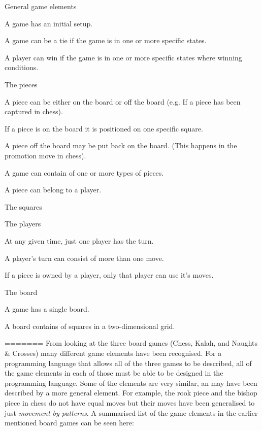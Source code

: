 \begin{dlist}
  \item[General game elements]
  	\begin{dlist}
  		\item A game has an initial setup.
  		\item A game can be a tie if the game is in one or more specific states.
  		\item A player can win if the game is in one or more specific states where winning conditions. 
  	\end{dlist}
  \item[The pieces]
  	\begin{dlist}
  		\item A piece can be either on the board or off the board (e.g. If a piece has been captured in chess).
  			\begin{dlist}
  				\item If a piece is on the board it is positioned on one specific square.
  				\item A piece off the board may be put back on the board. (This happens in the promotion move in chess).
  			\end{dlist}
  		\item A game can contain of one or more types of pieces.
  		\item A piece can belong to a player.
  	\end{dlist}
  \item[The squares]
  \item[The players]
  	\begin{dlist}
  		\item At any given time, just one player has the turn.
  		\item A player's turn can consist of more than one move.
  		\item If a piece is owned by a player, only that player can use it's moves.
  	\end{dlist}
  \item[The board]
  	\begin{dlist}
  		\item A game has a single board.
  		\item A board contains of squares in a two-dimensional grid.
  	\end{dlist}
=======
From looking at the three board games (Chess, Kalah, and Naughts \& Crosses) many different game elements have been recognised. For a programming language that allows all of the three games to be described, all of the game elements in each of those must be able to be designed in the programming language. Some of the elements are very similar, an may have been described by a more general element. For example, the rook piece and the bishop piece in chess do not have equal moves but their moves have been generalised to just \textit{movement by patterns}. A summarised list of the game elements in the earlier mentioned board games can be seen here:

\end{dlist}
